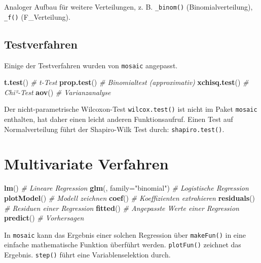 \documentclass[12pt,ngerman,paper=a4,pagesize,DIV=13]{scrreprt}
\newenvironment{Shaded}{\begin{snugshade}}{\end{snugshade}}
\newcommand{\CommentTok}[1]{\textcolor[rgb]{0.56,0.35,0.01}{\textit{#1}}}
\newcommand{\DataTypeTok}[1]{\textcolor[rgb]{0.13,0.29,0.53}{#1}}
\newcommand{\KeywordTok}[1]{\textcolor[rgb]{0.13,0.29,0.53}{\textbf{#1}}}
\newcommand{\NormalTok}[1]{#1}
\newcommand{\StringTok}[1]{\textcolor[rgb]{0.31,0.60,0.02}{#1}}
\begin{document}
Analoger Aufbau für weitere Verteilungen, z. B. \texttt{\_binom()}
(Binomialverteilung), \texttt{\_f()} (F\_Verteilung).

\hypertarget{testverfahren}{%
\subsection{Testverfahren}\label{testverfahren}}

Einige der Testverfahren wurden von \texttt{mosaic} angepasst.

\begin{Shaded}
\begin{Highlighting}[]
\KeywordTok{t.test}\NormalTok{() }\CommentTok{# t-Test}
\KeywordTok{prop.test}\NormalTok{() }\CommentTok{# Binomialtest (approximativ)}
\KeywordTok{xchisq.test}\NormalTok{() }\CommentTok{# Chi²-Test}
\KeywordTok{aov}\NormalTok{() }\CommentTok{# Varianzanalyse}
\end{Highlighting}
\end{Shaded}

Der nicht-parametrische Wilcoxon-Test \texttt{wilcox.test()} ist nicht
im Paket \texttt{mosaic} enthalten, hat daher einen leicht anderen
Funktionsaufruf. Einen Test auf Normalverteilung führt der Shapiro-Wilk
Test durch: \texttt{shapiro.test()}.

\hypertarget{multivariate-verfahren}{%
\section{Multivariate Verfahren}\label{multivariate-verfahren}}

\begin{Shaded}
\begin{Highlighting}[]
\KeywordTok{lm}\NormalTok{() }\CommentTok{# Lineare Regression}
\KeywordTok{glm}\NormalTok{(, }\DataTypeTok{family=}\StringTok{"binomial"}\NormalTok{) }\CommentTok{# Logistische Regression}
\KeywordTok{plotModel}\NormalTok{() }\CommentTok{# Modell zeichnen}
\KeywordTok{coef}\NormalTok{() }\CommentTok{# Koeffizienten extrahieren}
\KeywordTok{residuals}\NormalTok{() }\CommentTok{# Residuen einer Regression}
\KeywordTok{fitted}\NormalTok{() }\CommentTok{# Angepasste Werte einer Regression}
\KeywordTok{predict}\NormalTok{() }\CommentTok{# Vorhersagen}
\end{Highlighting}
\end{Shaded}

In \texttt{mosaic} kann das Ergebnis einer solchen Regression über
\texttt{makeFun()} in eine einfache mathematische Funktion überführt
werden. \texttt{plotFun()} zeichnet das Ergebnis. \texttt{step()} führt
eine Variablenselektion durch.
\end{document}
